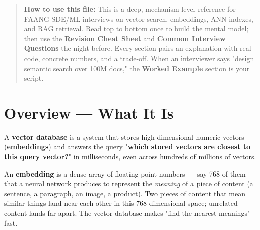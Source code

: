\documentclass[11pt]{article}
\begin{document}
\makecoverpage

\thispagestyle{empty}
{\hypersetup{hidelinks}\tableofcontents}
\clearpage

\begin{quote}
\textbf{How to use this file:} This is a deep, mechanism-level reference for FAANG SDE/ML interviews on vector search, embeddings, ANN indexes, and RAG retrieval. Read top to bottom once to build the mental model; then use the \textbf{Revision Cheat Sheet} and \textbf{Common Interview Questions} the night before. Every section pairs an explanation with real code, concrete numbers, and a trade-off. When an interviewer says "design semantic search over 100M docs," the \textbf{Worked Example} section is your script.
\end{quote}

\section{Overview --- What It Is}\label{overview--what-it-is}

A \textbf{vector database} is a system that stores high-dimensional numeric vectors (\textbf{embeddings}) and answers the query "\textbf{which stored vectors are closest to this query vector?}" in milliseconds, even across hundreds of millions of vectors.

An \textbf{embedding} is a dense array of floating-point numbers --- say 768 of them --- that a neural network produces to represent the \emph{meaning} of a piece of content (a sentence, a paragraph, an image, a product). Two pieces of content that mean similar things land near each other in this 768-dimensional space; unrelated content lands far apart. The vector database makes "find the nearest meanings" fast.
\end{document}
